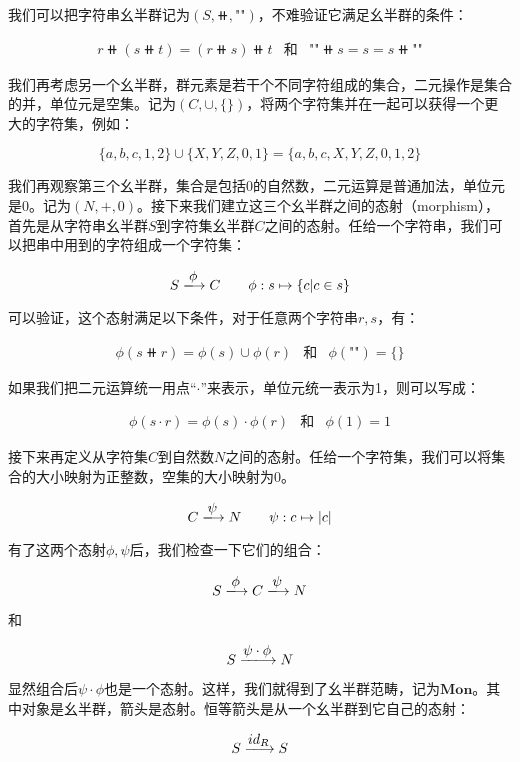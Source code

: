 \documentclass{article}
\begin{document}
我们可以把字符串幺半群记为$(S, \doubleplus, \texttt{""})$，不难验证它满足幺半群的条件：

\[
\begin{array}{rcl}
r \doubleplus (s \doubleplus t) = (r \doubleplus s) \doubleplus t &
\text{和} &
\texttt{""} \doubleplus s = s = s \doubleplus \texttt{""}
\end{array}
\]

我们再考虑另一个幺半群，群元素是若干个不同字符组成的集合，二元操作是集合的并，单位元是空集。记为$(C, \cup, \{\})$，将两个字符集并在一起可以获得一个更大的字符集，例如：

\[
\{a, b, c, 1, 2\} \cup \{X, Y, Z, 0, 1\} = \{a, b, c, X, Y, Z, 0, 1, 2\}
\]

我们再观察第三个幺半群，集合是包括0的自然数，二元运算是普通加法，单位元是0。记为$(N, +, 0)$。接下来我们建立这三个幺半群之间的态射（morphism），首先是从字符串幺半群$S$到字符集幺半群$C$之间的态射。任给一个字符串，我们可以把串中用到的字符组成一个字符集：

\[
S \arrowto{\phi} C \quad \quad \phi: s \mapsto \{c | c \in s\}
\]

可以验证，这个态射满足以下条件，对于任意两个字符串$r, s$，有：

\[
\begin{array}{rcl}
\phi(s \doubleplus r) = \phi(s) \cup \phi(r) & \text{和} & \phi(\texttt{""}) = \{\}
\end{array}
\]

如果我们把二元运算统一用点“$\cdot$”来表示，单位元统一表示为1，则可以写成：

\[
\begin{array}{rcl}
\phi(s \cdot r) = \phi(s) \cdot \phi(r) & \text{和} & \phi(1) = 1
\end{array}
\]

接下来再定义从字符集$C$到自然数$N$之间的态射。任给一个字符集，我们可以将集合的大小映射为正整数，空集的大小映射为0。

\[
C \arrowto{\psi} N \quad \quad \psi: c \mapsto |c|
\]

有了这两个态射$\phi, \psi$后，我们检查一下它们的组合：

\[
S \arrowto{\phi} C \arrowto{\psi} N
\]

和

\[
S \arrowto{\psi \cdot \phi} N
\]

显然组合后$\psi \cdot \phi$也是一个态射。这样，我们就得到了幺半群范畴，记为$\pmb{Mon}$。其中对象是幺半群，箭头是态射。恒等箭头是从一个幺半群到它自己的态射：

\[
S \arrowto{id_R} S
\]
\end{document}
